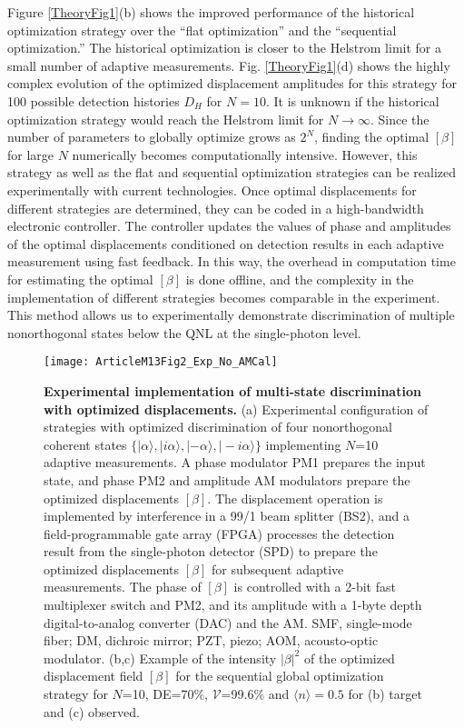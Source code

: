 \documentclass[twocolumn,pra,preprintnumbers,amsmath,amssymb,superscriptaddress,floatfix]{revtex4}%
\begin{document}
Figure \ref{TheoryFig1}(b) shows the improved performance of the historical optimization strategy
over the ``flat optimization'' and the ``sequential
optimization.'' The historical optimization is closer to the Helstrom limit for
a small number of adaptive measurements. Fig. \ref{TheoryFig1}(d) shows the highly
complex evolution of
the optimized displacement amplitudes for this strategy for 100
possible detection histories $D_{H}$ for $N=10$. It is unknown if the historical optimization strategy
would reach the Helstrom limit for $N\rightarrow\infty$. Since the number of parameters to globally optimize grows as
$2^N$, finding the optimal $[\beta]$ for large $N$ numerically becomes computationally intensive.
However,
this strategy as well as the flat and sequential optimization strategies can be realized experimentally with current
technologies. Once optimal displacements for different strategies are determined, they can be coded in a high-bandwidth electronic controller. The controller updates the values of phase and amplitudes
of the optimal displacements conditioned on detection results in each adaptive measurement using fast feedback. In this way, the
overhead in computation time for estimating the optimal $[\beta]$ is done offline, and the complexity in the implementation of different strategies becomes comparable
in the experiment. This method allows us to experimentally demonstrate discrimination of multiple
nonorthogonal states below the QNL at the single-photon level.
\\

\begin{figure}[htbp]
\centering\texttt{[image: ArticleM13Fig2\_Exp\_No\_AMCal]}
\caption{\label{ExpConfFig} \textbf{Experimental implementation of
multi-state discrimination with optimized displacements.} (a)
Experimental configuration of strategies with optimized
discrimination of four nonorthogonal coherent states
$\{|\alpha\rangle,
|i\alpha\rangle,|-\alpha\rangle,|-i\alpha\rangle\}$ implementing
$N$=10 adaptive measurements. A phase modulator PM1 prepares the
input state, and phase PM2 and amplitude AM modulators prepare the
optimized displacements $[\beta]$. The displacement operation is
implemented by interference in a 99/1 beam splitter (BS2), and a
field-programmable gate array (FPGA) processes the detection result
from the single-photon detector (SPD) to prepare the optimized
displacements $[\beta]$ for subsequent adaptive measurements. The
phase of $[\beta]$ is controlled with a 2-bit fast multiplexer
switch and PM2, and its amplitude with a 1-byte depth
digital-to-analog converter (DAC) and the AM. SMF, single-mode
fiber; DM, dichroic mirror; PZT, piezo; AOM, acousto-optic
modulator. (b,c) Example of the intensity $|\beta|^2$ of the optimized displacement
field $[\beta]$ for the sequential global optimization strategy for
$N$=10, DE=70\%, $\mathcal{V}$=99.6\% and $\langle n\rangle=0.5$ for (b)
target and (c) observed.}
\end{figure}
\end{document}
